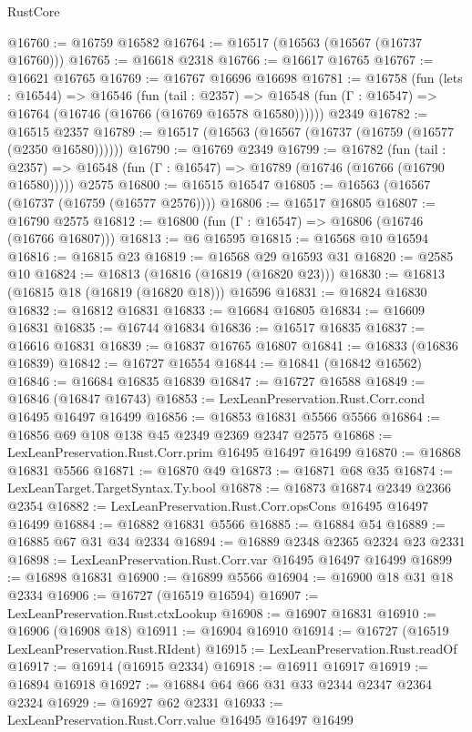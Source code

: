 \begin{lexlean}{RustCore}
\begin{coremodule}
@16760 := @16759 @16582
@16764 := @16517 (@16563 (@16567 (@16737 @16760)))
@16765 := @16618 @2318
@16766 := @16617 @16765
@16767 := @16621 @16765
@16769 := @16767 @16696 @16698
@16781 := @16758
    (fun (lets : @16544) =>
    @16546
      (fun (tail : @2357) =>
      @16548 (fun (Γ : @16547) => @16764 (@16746 (@16766 (@16769 @16578 @16580))))))
    @2349
@16782 := @16515 @2357
@16789 := @16517 (@16563 (@16567 (@16737 (@16759 (@16577 (@2350 @16580))))))
@16790 := @16769 @2349
@16799 := @16782
    (fun (tail : @2357) => @16548 (fun (Γ : @16547) => @16789 (@16746 (@16766 (@16790 @16580)))))
    @2575
@16800 := @16515 @16547
@16805 := @16563 (@16567 (@16737 (@16759 (@16577 @2576))))
@16806 := @16517 @16805
@16807 := @16790 @2575
@16812 := @16800 (fun (Γ : @16547) => @16806 (@16746 (@16766 @16807)))
@16813 := @6 @16595
@16815 := @16568 @10 @16594
@16816 := @16815 @23
@16819 := @16568 @29 @16593 @31
@16820 := @2585 @10
@16824 := @16813 (@16816 (@16819 (@16820 @23)))
@16830 := @16813 (@16815 @18 (@16819 (@16820 @18))) @16596
@16831 := @16824 @16830
@16832 := @16812 @16831
@16833 := @16684 @16805
@16834 := @16609 @16831
@16835 := @16744 @16834
@16836 := @16517 @16835
@16837 := @16616 @16831
@16839 := @16837 @16765 @16807
@16841 := @16833 (@16836 @16839)
@16842 := @16727 @16554
@16844 := @16841 (@16842 @16562)
@16846 := @16684 @16835 @16839
@16847 := @16727 @16588
@16849 := @16846 (@16847 @16743)
@16853 := LexLeanPreservation.Rust.Corr.cond @16495 @16497 @16499
@16856 := @16853 @16831 @5566 @5566
@16864 := @16856 @69 @108 @138 @45 @2349 @2369 @2347 @2575
@16868 := LexLeanPreservation.Rust.Corr.prim @16495 @16497 @16499
@16870 := @16868 @16831 @5566
@16871 := @16870 @49
@16873 := @16871 @68 @35
@16874 := LexLeanTarget.TargetSyntax.Ty.bool
@16878 := @16873 @16874 @2349 @2366 @2354
@16882 := LexLeanPreservation.Rust.Corr.opsCons @16495 @16497 @16499
@16884 := @16882 @16831 @5566
@16885 := @16884 @54
@16889 := @16885 @67 @31 @34 @2334
@16894 := @16889 @2348 @2365 @2324 @23 @2331
@16898 := LexLeanPreservation.Rust.Corr.var @16495 @16497 @16499
@16899 := @16898 @16831
@16900 := @16899 @5566
@16904 := @16900 @18 @31 @18 @2334
@16906 := @16727 (@16519 @16594)
@16907 := LexLeanPreservation.Rust.ctxLookup
@16908 := @16907 @16831
@16910 := @16906 (@16908 @18)
@16911 := @16904 @16910
@16914 := @16727 (@16519 LexLeanPreservation.Rust.RIdent)
@16915 := LexLeanPreservation.Rust.readOf
@16917 := @16914 (@16915 @2334)
@16918 := @16911 @16917
@16919 := @16894 @16918
@16927 := @16884 @64 @66 @31 @33 @2344 @2347 @2364 @2324
@16929 := @16927 @62 @2331
@16933 := LexLeanPreservation.Rust.Corr.value @16495 @16497 @16499

\end{coremodule}
\end{lexlean}
